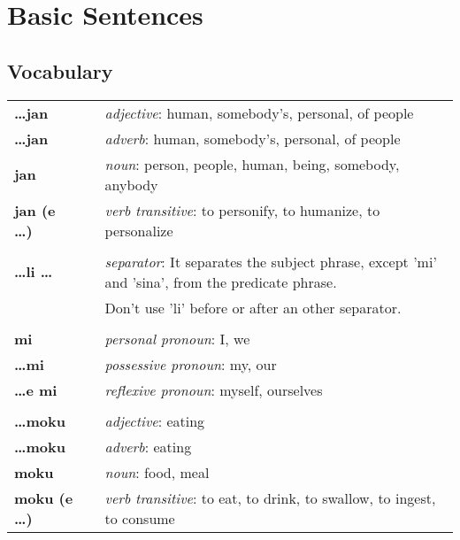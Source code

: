 \section{Basic Sentences}
\subsection*{Vocabulary}
%
\begin{supertabular}{p{2,5cm}|ll}
%
%
\textbf{\dots jan} && \textit{adjective}: human, somebody's, personal, of people \\ %
\textbf{\dots jan} && \textit{adverb}: human, somebody's, personal, of people \\ %
\textbf{jan} && \textit{noun}: person, people, human, being, somebody, anybody \\ %
\textbf{jan (e \dots)} && \textit{verb transitive}: to personify, to humanize, to personalize \\ %
 && \\ %
%
\textbf{\dots li \dots} && \textit{separator}: It separates the subject phrase, except 'mi' and 'sina', from the predicate phrase. \\ && Don't use 'li' before or after an other separator. \\ %
 && \\ %
%
\textbf{mi} && \textit{personal pronoun}: I, we  \\ 
\textbf{\dots mi} && \textit{possessive pronoun}: my, our \\  
\textbf{\dots e mi} && \textit{reflexive pronoun}: myself, ourselves  \\ 
 && \\ %
%
\textbf{\dots moku} && \textit{adjective}: eating \\ %
\textbf{\dots moku} && \textit{adverb}: eating \\ %
\textbf{moku} && \textit{noun}: food, meal \\ %
\textbf{moku (e \dots)} && \textit{verb transitive}: to eat, to drink, to swallow, to ingest, to consume \\ %

\end{supertabular}
